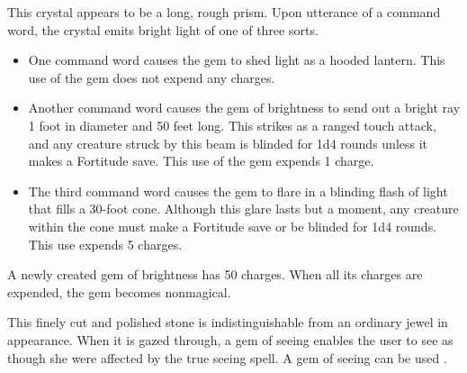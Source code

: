 {

 This crystal appears to be a long, rough prism. Upon utterance of a command word, the crystal emits bright light of one of three sorts.
\begin{itemize}
\item One command word causes the gem to shed light as a hooded lantern. This use of the gem does not expend any charges.
\item Another command word causes the gem of brightness to send out a bright ray 1 foot in diameter and 50 feet long. This strikes as a ranged touch attack, and any creature struck by this beam is blinded for 1d4 rounds unless it makes a Fortitude save. This use of the gem expends 1 charge.
\item The third command word causes the gem to flare in a blinding flash of light that fills a 30-foot cone. Although this glare lasts but a moment, any creature within the cone must make a Fortitude save or be blinded for 1d4 rounds. This use expends 5 charges.
\end{itemize}

A newly created gem of brightness has 50 charges. When all its charges are expended, the gem becomes nonmagical.


 This finely cut and polished stone is indistinguishable from an ordinary jewel in appearance. When it is gazed through, a gem of seeing enables the user to see as though she were affected by the true seeing spell. A gem of seeing can be used .


\begin{comment}
Golem Manual} A golem manual contains information, incantations and magical power that help a character to craft a golem. The instructions therein grant a \plus5 \my{circumstance} bonus on skill checks made to craft the golem's body. Each manual also holds the prerequisite spells needed for a specific golem, effectively grants the builder use of the Craft Construct feat during the construction of the golem, and grants the character an increase to her caster level for the purpose of crafting a golem.


\end{comment}}
